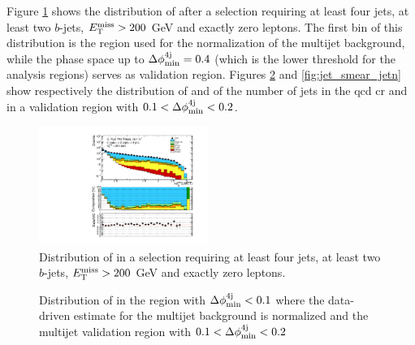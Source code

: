 Figure \ref{fig:jet_smear_dphi} shows the distribution of \dphimin after a selection requiring at least four jets, at least two $b$-jets, $E_{\rm T}^{\mathrm{miss}}>200$ GeV and exactly zero leptons. The first bin of this distribution is the region used for the normalization of the multijet background, 
while the phase space up to $\Delta\phi_{\rm{min}}^{4{\rm{j}}}=0.4$ (which is the lower threshold for the analysis regions) serves as validation region. 
Figures \ref{fig:jet_smear_met} and \ref{fig:jet_smear_jetn} show respectively the distribution of \met and of the number of jets in the \gls{qcd} \gls{cr} and in a validation region with $0.1 < \Delta\phi_{\rm{min}}^{4{\rm{j}}} < 0.2$.

\begin{figure}[h!]
\centering 
\includegraphics[width=0.49\textwidth]{figures/susy_common/jet_smearing/data_mc_dphi_min_QCD_noDphi.pdf}
\caption{Distribution of \dphimin in a selection requiring at least four jets, at least two $b$-jets, $E_{\rm T}^{\mathrm{miss}}>200$ GeV and exactly zero leptons.}\label{fig:jet_smear_dphi}
\end{figure}


\begin{figure}[h!]
\centering 
{}
\caption{Distribution of \met in  the region with $\Delta\phi_{\rm{min}}^{4{\rm{j}}} < 0.1$ where the data-driven estimate for the multijet background is normalized and  the multijet validation region with $0.1 < \Delta\phi_{\rm{min}}^{4{\rm{j}}} < 0.2$}\label{fig:jet_smear_met}
\end{figure}

